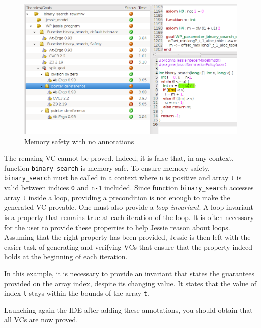 \documentclass[a4paper,11pt,twoside,openright]{report}
\begin{document}
\begin{figure}[t]
  \begin{center}
  \includegraphics[width=1.0\linewidth]{jessie/binary_search_raw.png}
  \end{center}
  \caption{Memory safety with no annotations}
  \label{fig:raw}
  \hrulefill
\end{figure}

The remaing VC cannot be proved. Indeed, it is false that, in any
context, function \verb|binary_search| is memory safe. To ensure
memory safety, \verb|binary_search| must be called in a context where
\verb|n| is positive and array \verb|t| is valid between indices
\verb|0| and \verb|n-1| included. Since function \verb|binary_search|
accesses array \verb|t| inside a loop, providing a precondition is not
enough to make the generated VC provable.  One must also provide a
\emph{loop invariant}. A loop invariant is a property that remains
true at each iteration of the loop.  It is often necessary for the
user to provide these properties to help Jessie reason about
loops. Assuming that the right property has been provided, Jessie is
then left with the easier task of generating and verifying VCs that
ensure that the property indeed holds at the beginning of each
iteration.

In this example, it is necessary to provide an invariant that states
the guarantees provided on the array index, despite its changing
value. It states that the value of index \verb|l| stays within the
bounds of the array \verb|t|.



Launching again the IDE after adding these annotations, you should
obtain that all VCs are now proved.
\end{document}
